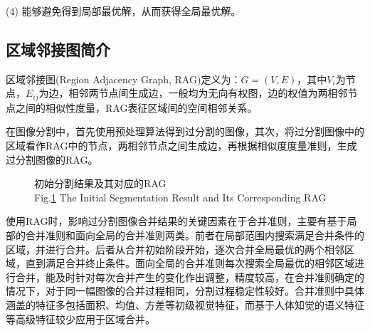 (4) 能够避免得到局部最优解，从而获得全局最优解。


\subsection{区域邻接图简介}
区域邻接图(Region Adjacency Graph, RAG)定义为：$G=(V,E)$，其中$V_i$为节点，$E_{ij}$为边，相邻两节点间生成边，一般均为无向有权图，边的权值为两相邻节点之间的相似性度量，RAG表征区域间的空间相邻关系。

在图像分割中，首先使用预处理算法得到过分割的图像，其次，将过分割图像中的区域看作RAG中的节点，两相邻节点之间生成边，再根据相似度度量准则，生成过分割图像的RAG。


\begin{figure}[H]
    \centering
    \captionsetup{justification=centering}
    \caption{初始分割结果及其对应的RAG \\ Fig.\ref{初始分割结果及其对应的RAG} The Initial Segmentation Result and Its Corresponding RAG}
    \label{初始分割结果及其对应的RAG}
\end{figure}

使用RAG时，影响过分割图像合并结果的关键因素在于合并准则，主要有基于局部的合并准则和面向全局的合并准则两类。前者在局部范围内搜索满足合并条件的区域，并进行合并。后者从合并初始阶段开始，逐次合并全局最优的两个相邻区域，直到满足合并终止条件。面向全局的合并准则每次搜索全局最优的相邻区域进行合并，能及时针对每次合并产生的变化作出调整，精度较高，在合并准则确定的情况下，对于同一幅图像的合并过程相同，分割过程稳定性较好。合并准则中具体涵盖的特征多包括面积、均值、方差等初级视觉特征，而基于人体知觉的语义特征等高级特征较少应用于区域合并。

